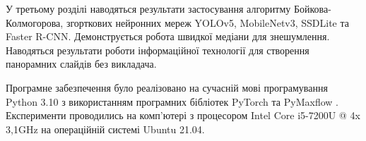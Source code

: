 У третьому розділі наводяться результати 
застосування алгоритму Бойкова-Колмогорова,
згорткових нейронних мереж  YOLOv5, MobileNetv3, SSDLite та
Faster R-CNN. Демонструється робота швидкої медіани для знешумлення. 
Наводяться результати роботи інформаційної технології для створення 
панорамних слайдів без викладача.

Програмне забезпечення було реалізовано
на сучасній мові програмування Python 3.10 \cite{bib:python_language}
з використанням програмних бібліотек PyTorch \cite{bib:pytorch_library} та 
PyMaxflow \cite{website:pymaxflow_library}.
Експерименти проводились на комп'ютері з
процесором Intel Core i5-7200U @ 4x 3,1GHz на операційній системі Ubuntu 21.04.

